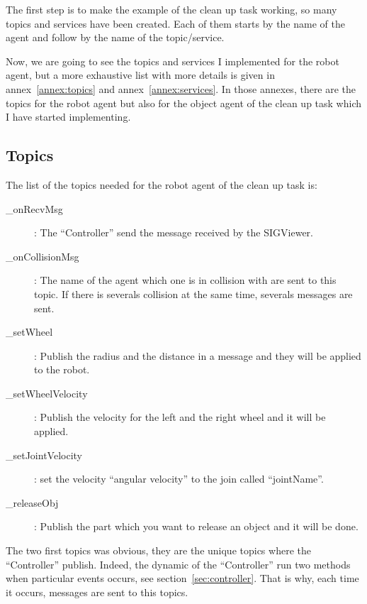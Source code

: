 The first step is to make the example of the clean up task working, so many topics and services have been created. Each of them starts by the name of the agent and follow by the name of the topic/service.

Now, we are going to see the topics and services I implemented for the robot agent, but a more exhaustive list with more details is given in annex~\ref{annex:topics} and annex~\ref{annex:services}. In those annexes, there are the topics for the robot agent but also for the object agent of the clean up task which I have started implementing.

\subsection{Topics}
The list of the topics needed for the robot agent of the clean up task is:
\begin{description}
	\item[\_onRecvMsg] : The ``Controller'' send the message received by the SIGViewer.
	\item[\_onCollisionMsg] : The name of the agent which one is in collision with are sent to this topic. If there is severals collision at the same time, severals messages are sent.
	\item[\_setWheel] : Publish the radius and the distance in a message and they will be applied to the robot.
	\item[\_setWheelVelocity] : Publish the velocity for the left and the right wheel and it will be applied.
	\item[\_setJointVelocity] : set the velocity ``angular velocity'' to the join called ``jointName''.
	\item[\_releaseObj]: Publish the part which you want to release an object and it will be done.
\end{description}

The two first topics was obvious, they are the unique topics where the ``Controller'' publish. Indeed, the dynamic of the ``Controller'' run two methods when particular events occurs, see section~\ref{sec:controller}. That is why, each time it occurs, messages are sent to this topics.

